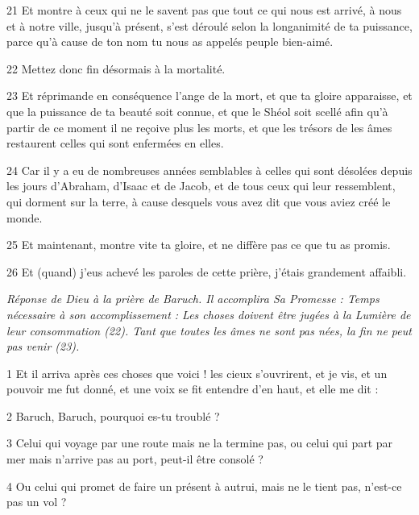 \par 21 Et montre à ceux qui ne le savent pas que tout ce qui nous est arrivé, à nous et à notre ville, jusqu'à présent, s'est déroulé selon la longanimité de ta puissance, parce qu'à cause de ton nom tu nous as appelés peuple bien-aimé.

\par 22 Mettez donc fin désormais à la mortalité.

\par 23 Et réprimande en conséquence l'ange de la mort, et que ta gloire apparaisse, et que la puissance de ta beauté soit connue, et que le Shéol soit scellé afin qu'à partir de ce moment il ne reçoive plus les morts, et que les trésors de les âmes restaurent celles qui sont enfermées en elles.

\par 24 Car il y a eu de nombreuses années semblables à celles qui sont désolées depuis les jours d'Abraham, d'Isaac et de Jacob, et de tous ceux qui leur ressemblent, qui dorment sur la terre, à cause desquels vous avez dit que vous aviez créé le monde.

\par 25 Et maintenant, montre vite ta gloire, et ne diffère pas ce que tu as promis.

\par 26 Et (quand) j'eus achevé les paroles de cette prière, j'étais grandement affaibli.


\par \textit{Réponse de Dieu à la prière de Baruch. Il accomplira Sa Promesse : Temps nécessaire à son accomplissement : Les choses doivent être jugées à la Lumière de leur consommation (22). Tant que toutes les âmes ne sont pas nées, la fin ne peut pas venir (23).}

\par 1 Et il arriva après ces choses que voici ! les cieux s'ouvrirent, et je vis, et un pouvoir me fut donné, et une voix se fit entendre d'en haut, et elle me dit :

\par 2 Baruch, Baruch, pourquoi es-tu troublé ?

\par 3 Celui qui voyage par une route mais ne la termine pas, ou celui qui part par mer mais n'arrive pas au port, peut-il être consolé ?

\par 4 Ou celui qui promet de faire un présent à autrui, mais ne le tient pas, n'est-ce pas un vol ?

